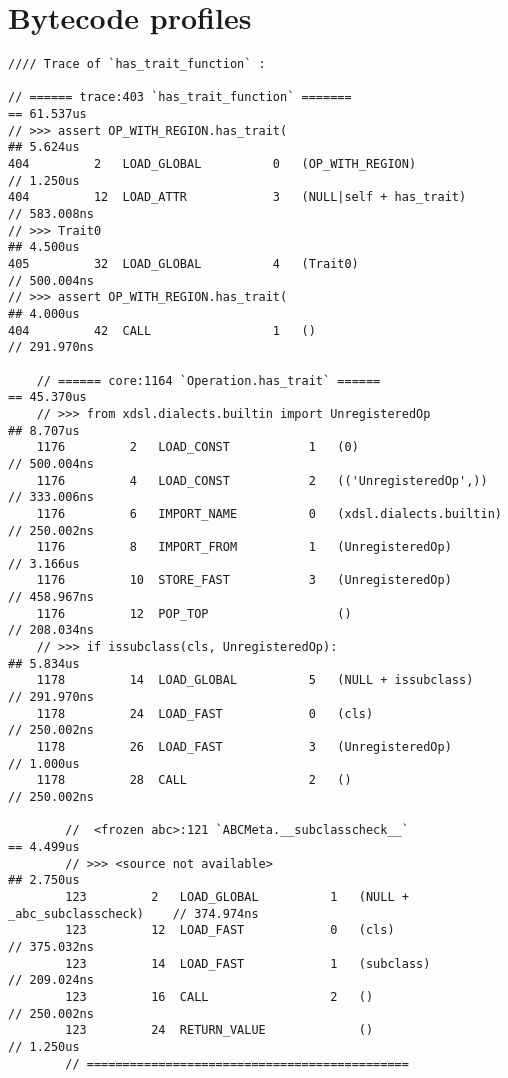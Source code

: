 \chapter{Bytecode profiles}
\label{chap:bytecode-profiles}

\begin{code}
    \begin{verbatim}
//// Trace of `has_trait_function` :

// ====== trace:403 `has_trait_function` =======                                == 61.537us
// >>> assert OP_WITH_REGION.has_trait(                                         ## 5.624us
404         2   LOAD_GLOBAL          0   (OP_WITH_REGION)                       // 1.250us
404         12  LOAD_ATTR            3   (NULL|self + has_trait)                // 583.008ns
// >>> Trait0                                                                   ## 4.500us
405         32  LOAD_GLOBAL          4   (Trait0)                               // 500.004ns
// >>> assert OP_WITH_REGION.has_trait(                                         ## 4.000us
404         42  CALL                 1   ()                                     // 291.970ns

    // ====== core:1164 `Operation.has_trait` ======                            == 45.370us
    // >>> from xdsl.dialects.builtin import UnregisteredOp                     ## 8.707us
    1176         2   LOAD_CONST           1   (0)                               // 500.004ns
    1176         4   LOAD_CONST           2   (('UnregisteredOp',))             // 333.006ns
    1176         6   IMPORT_NAME          0   (xdsl.dialects.builtin)           // 250.002ns
    1176         8   IMPORT_FROM          1   (UnregisteredOp)                  // 3.166us
    1176         10  STORE_FAST           3   (UnregisteredOp)                  // 458.967ns
    1176         12  POP_TOP                  ()                                // 208.034ns
    // >>> if issubclass(cls, UnregisteredOp):                                  ## 5.834us
    1178         14  LOAD_GLOBAL          5   (NULL + issubclass)               // 291.970ns
    1178         24  LOAD_FAST            0   (cls)                             // 250.002ns
    1178         26  LOAD_FAST            3   (UnregisteredOp)                  // 1.000us
    1178         28  CALL                 2   ()                                // 250.002ns

        //  <frozen abc>:121 `ABCMeta.__subclasscheck__`                        == 4.499us
        // >>> <source not available>                                           ## 2.750us
        123         2   LOAD_GLOBAL          1   (NULL + _abc_subclasscheck)    // 374.974ns
        123         12  LOAD_FAST            0   (cls)                          // 375.032ns
        123         14  LOAD_FAST            1   (subclass)                     // 209.024ns
        123         16  CALL                 2   ()                             // 250.002ns
        123         24  RETURN_VALUE             ()                             // 1.250us
        // =============================================


\end{verbatim}
\end{code}
